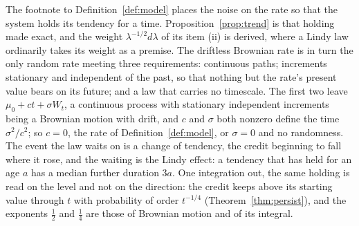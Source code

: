 \begin{remark}\label{rem:genericrate}
The footnote to Definition~\ref{def:model} places the noise on the rate so
that the system holds its tendency for a time.
Proposition~\ref{prop:trend} is that holding made exact, and the weight
$\lambda^{-1/2}d\lambda$ of its item (ii) is derived, where a Lindy law
ordinarily takes its weight as a premise. The driftless Brownian rate is
in turn the only random rate meeting three requirements: continuous
paths; increments stationary and independent of the past, so that nothing
but the rate's present value bears on its future; and a law that carries
no timescale. The first two leave $\mu_0+ct+\sigma W_t$, a continuous
process with stationary independent increments being a Brownian motion
with drift, and $c$ and $\sigma$ both nonzero define the time
$\sigma^2/c^2$; so $c=0$, the rate of Definition~\ref{def:model}, or
$\sigma=0$ and no randomness. The event the law waits on is a change of
tendency, the credit beginning to fall where it rose, and the waiting is
the Lindy effect: a tendency that has held for an age $a$ has a median
further duration $3a$. One integration out, the same holding is read on
the level and not on the direction: the credit keeps above its starting
value through $t$ with probability of order $t^{-1/4}$
(Theorem~\ref{thm:persist}), and the exponents $\tfrac12$ and $\tfrac14$
are those of Brownian motion and of its integral.
\end{remark}

